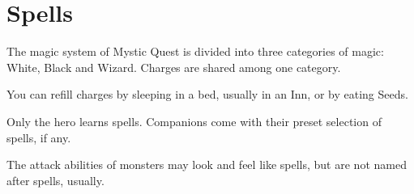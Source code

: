 \chapter{Spells}

The magic system of Mystic Quest is divided into three categories of magic: White, Black and Wizard. Charges are shared among one category.

You can refill charges by sleeping in a bed, usually in an Inn, or by eating Seeds.

Only the hero learns spells. Companions come with their preset selection of spells, if any.

The attack abilities of monsters may look and feel like spells, but are not named after spells, usually.

\newpage

\newpage

\newpage

\newpage

\newpage

\newpage

\newpage

\newpage

\newpage

\newpage

\newpage

\newpage

